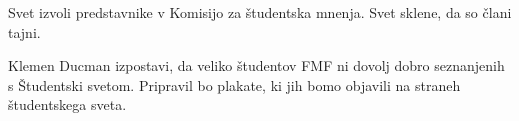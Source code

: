 \documentclass{seja}
\begin{document}
\begin{ad}
	\begin{sklep*}
		Svet izvoli predstavnike v Komisijo za študentska mnenja. 
		Svet sklene, da so člani tajni.
	\end{sklep*}

\item
Klemen Ducman izpostavi, da veliko študentov FMF ni dovolj dobro seznanjenih s Študentski svetom. Pripravil bo plakate, ki jih bomo objavili na straneh študentskega sveta.

\end{ad}


\makeatletter \global\let\@enddocumenthook\@empty \makeatother
{}
\end{document}
